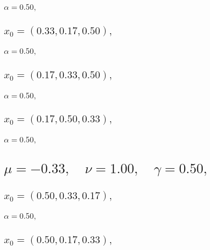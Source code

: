\documentclass[a4paper]{article}
\begin{document}
\begin{multicols*}{2}
   \subsubsection{\(\alpha = 0.50,\quad \)}
   

   \subsection{\(x_0 = (0.33,0.17,0.50),\quad \)}
   

   \subsubsection{\(\alpha = 0.50,\quad \)}
   

   \subsection{\(x_0 = (0.17,0.33,0.50),\quad \)}
   

   \subsubsection{\(\alpha = 0.50,\quad \)}
   

   \subsection{\(x_0 = (0.17,0.50,0.33),\quad \)}
   

   \subsubsection{\(\alpha = 0.50,\quad \)}
   

   \section{\(\mu = -0.33,\quad \nu = 1.00,\quad \gamma = 0.50,\quad \)}
   

   \subsection{\(x_0 = (0.50,0.33,0.17),\quad \)}
   

   \subsubsection{\(\alpha = 0.50,\quad \)}
   

   \subsection{\(x_0 = (0.50,0.17,0.33),\quad \)}
   


\end{multicols*}
\end{document}
